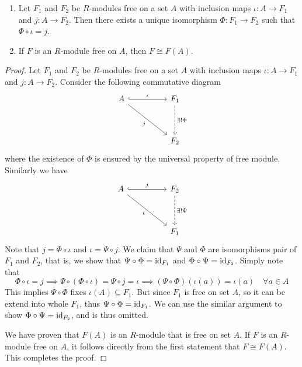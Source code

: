 \begin{cor}
    \hfill
    \begin{enumerate}
        \item Let $F_1$ and $F_2$ be $R$-modules free on a set $A$ with inclusion maps $\iota:A\to F_1$ and $j:A\to F_2$. Then there exists a unique isomorphism $\Phi:F_1\to F_2$ such that $\Phi\circ\iota = j$.
        \item If $F$ is an $R$-module free on $A$, then $F\cong F(A)$.
    \end{enumerate}
\end{cor}
\begin{proof}
    Let $F_1$ and $F_2$ be $R$-modules free on a set $A$ with inclusion maps $\iota:A\to F_1$ and $j:A\to F_2$. Consider the following commutative diagram 
    \[\begin{tikzcd}
	   A && F_1 \\
	   \\
	   && F_2
	   \arrow["\iota", hook, from=1-1, to=1-3]
	   \arrow["j"', from=1-1, to=3-3]
	   \arrow["{\exists! \Phi}", dashed, from=1-3, to=3-3]
    \end{tikzcd}\]
    where the existence of $\Phi$ is ensured by the universal property of free module. Similarly we have
    \[\begin{tikzcd}
	   A && F_2 \\
	   \\
	   && F_1
	   \arrow["j", hook, from=1-1, to=1-3]
	   \arrow["\iota"', from=1-1, to=3-3]
	   \arrow["{\exists! \Psi}", dashed, from=1-3, to=3-3]
    \end{tikzcd}\]
    Note that $j = \Phi \circ \iota$ and $\iota = \Psi \circ j$. We claim that $\Psi$ and $\Phi$ are isomorphisms pair of $F_1$ and $F_2$, that is, we show that $\Psi \circ \Phi = \operatorname{id}_{F_1}$ and $\Phi \circ \Psi = \operatorname{id}_{F_2}$. Simply note that 
    \[\Phi \circ \iota = j \implies \Psi\circ (\Phi \circ \iota) = \Psi \circ j = \iota \implies (\Psi \circ \Phi)(\iota(a)) =\iota(a)\quad  \forall a\in A\]
    This implies $\Psi\circ \Phi$ fixes $\iota(A)\subseteq F_1$. But since $F_1$ is free on set $A$, so it can be extend into whole $F_1$, thus $\Psi \circ \Phi = \operatorname{id}_{F_1}$. We can use the similar argument to show $\Phi \circ \Psi = \operatorname{id}_{F_2}$, and is thus omitted.

    We have proven that $F(A)$ is an $R$-module that is free on set $A$. If $F$ is an $R$-module free on $A$, it follows directly from the first statement that $F\cong F(A)$. This completes the proof.
\end{proof}

